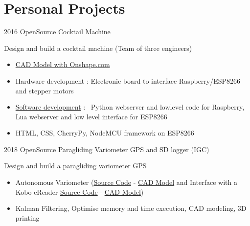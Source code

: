\documentclass[a4paper]{friggeri-cv} %
\begin{document}

\section{Personal Projects}

\begin{entrylist}

\entry
{2016}
{OpenSource Cocktail Machine}
{  }
{Design and build a cocktail machine (Team of three engineers)
\begin{itemize}
\item \href{https://cad.onshape.com/documents/fb6038b2912b9dee202ae483/w/fca3360b8bc95b6a2f76da72/e/469430195367acaf31facc33}{CAD Model with Onshape.com}
\item { Hardware development : Electronic board to interface Raspberry/ESP8266 and stepper motors }
\item {\href{https://github.com/tilaktilak/Inebriator}{Software development} : \
Python webserver and lowlevel code for Raspberry, Lua webserver and low level interface for ESP8266}
\item {HTML, CSS, CherryPy, NodeMCU framework on ESP8266}
\end{itemize}
}

\entry
{2018}
{OpenSource Paragliding Variometer GPS and SD logger (IGC)}
{}
{Design and build a paragliding variometer GPS
\begin{itemize}
\item Autonomous Variometer (\href{https://github.com/tilaktilak/variometre}{Source Code} - \href{https://cad.onshape.com/documents/a2edef2565390c2a63887be6/w/e115fc79a19f6ea7701f931d/e/4bf08f905543160a6d4a78ce}{CAD Model} 
and Interface with a Kobo eReader \href{https://github.com/tilaktilak/xcvario}{Source Code} - \href{https://cad.onshape.com/documents/e35f287762e7eb2639163738/w/944245d017b66dfac14ea554/e/e65c9aaedd3effabe6219e48}{CAD Model})
\item Kalman Filtering, Optimise memory and time execution, CAD modeling, 3D printing
\end{itemize}}


\end{entrylist}
\end{document}
